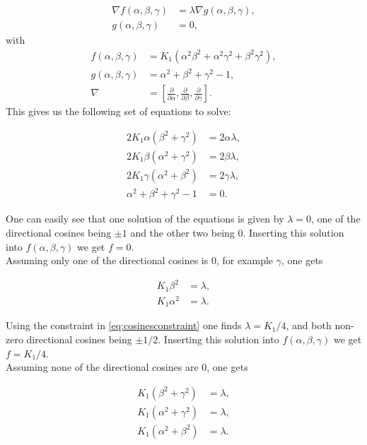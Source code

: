 \documentclass[1p]{elsarticle}		%
\begin{document}
\begin{align}
\nabla f(\alpha, \beta, \gamma) &= \lambda \nabla g(\alpha, \beta, \gamma), \\
g(\alpha, \beta, \gamma) &= 0,
\end{align}
with
\begin{align}
f(\alpha, \beta, \gamma) &= K_1 (\alpha^2\beta^2+\alpha^2\gamma^2+\beta^2\gamma^2), \\
g(\alpha, \beta, \gamma) &= \alpha^2+\beta^2+\gamma^2 - 1,\\
\nabla &= \left[\frac{\partial}{\partial\alpha}, \frac{\partial}{\partial\beta}, \frac{\partial}{\partial\gamma}\right].
\end{align}
This gives us the following set of equations to solve:

\begin{align*}
2K_1\alpha (\beta^2+\gamma^2) &= 2\alpha\lambda, \\ 
2K_1\beta (\alpha^2+\gamma^2) &= 2\beta\lambda, \\ 
2K_1\gamma (\alpha^2+\beta^2) &= 2\gamma\lambda, \\ 
\alpha^2+\beta^2+\gamma^2 - 1 &= 0.
\end{align*}

One can easily see that one solution of the equations is given by $\lambda = 0$, one of the directional cosines being $\pm 1$ and the other two being 0. Inserting this solution into $f(\alpha, \beta, \gamma)$ we get $f = 0$. \\

Assuming only one of the directional cosines is 0, for example $\gamma$, one gets

\begin{align*}
K_1 \beta^2 &= \lambda, \\ 
K_1 \alpha^2 &= \lambda.
\end{align*}

Using the constraint in \eqref{eq:cosinesconstraint} one finds $\lambda = K_1/4$, and both non-zero directional cosines being $\pm 1/2$. Inserting this solution into $f(\alpha, \beta, \gamma)$ we get $f = K_1/4$. \\

Assuming none of the directional cosines are 0, one gets

\begin{align*}
K_1 (\beta^2+\gamma^2) &= \lambda, \\ 
K_1 (\alpha^2+\gamma^2) &= \lambda, \\ 
K_1 (\alpha^2+\beta^2) &= \lambda.
\end{align*}
\end{document}
